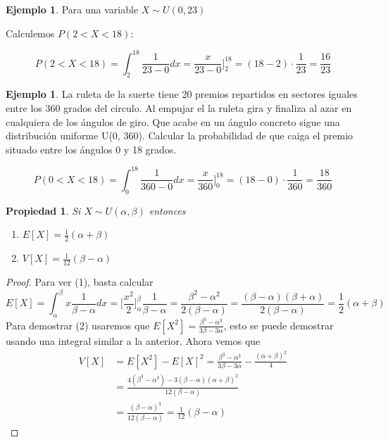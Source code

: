 \documentclass[]{book}
\theoremstyle{plain}
\newtheorem{property}[theorem]{Propiedad}
\theoremstyle{definition}
\newtheorem{example}[theorem]{Ejemplo}
\theoremstyle{definition} %
\begin{document}
\begin{example}
  Para una variable  $\displaystyle X\sim U(0,23)$


  Calculemos $\displaystyle  P(2<X<18)$:

   \[\displaystyle P(2<X<18)=\int^{18}_2 \frac {1}{23-0} dx 
   =  \frac {x}{23-0} \bigg]^{18}_2 =  (18-2)\cdot {\frac {1}{23}}={\frac {16}{23}} \]
\end{example}

\begin{example}
La ruleta de la suerte tiene 20 premios repartidos en sectores iguales entre los 360 grados del círculo. Al empujar el 
la ruleta gira y finaliza al azar en cualquiera de los ángulos de giro. 
Que acabe en un ángulo concreto sigue una distribución uniforme U(0, 360). 
Calcular la probabilidad de que caiga el premio situado entre los ángulos 0 y 18 grados.
 

\[\displaystyle P(0<X<18)=\int^{18}_0 \frac {1}{360-0} dx 
=  \frac {x}{360} \bigg]^{18}_0 =  (18-0)\cdot {\frac {1}{360}}={\frac {18}{360}} \]

\end{example}

\begin{property}
  Si $X \sim  U(\alpha, \beta)$ entonces 
  \begin{enumerate}
    \item $E[X] = \frac{1}{2} (\alpha+\beta)$
    \item $V[X] = \frac{1}{12} (\beta-\alpha)$
  \end{enumerate}
\end{property}

\begin{proof}
  Para ver (1), basta calcular 
  \[E[X] = \int^{\beta}_{\alpha} x \frac{1}{\beta - \alpha} dx 
  = \bigg[\frac{x^2}{2}\bigg]^{\beta}_{\alpha}\frac{1}{\beta - \alpha}  =  \frac{\beta^2-\alpha^2}{2(\beta - \alpha)}
  = \frac{(\beta-\alpha)(\beta + \alpha)}{2(\beta - \alpha)} = \frac{1}{2} (\alpha+\beta) \]
  Para demostrar (2) usaremos que $E[X^2] = \frac{\beta^3 - \alpha^3}{3\beta - 3\alpha}$, esto se puede demostrar usando una integral similar a la anterior. 
  Ahora vemos que 
  \begin{align*}
    V[X] &= E[X^2] - E[X]^2 = \frac{\beta^3 - \alpha^3}{3\beta-3\alpha} - \frac{(\alpha+\beta)^2}{4} \\
    &= \frac{4(\beta^3 - \alpha^3) - 3(\beta-\alpha)(\alpha+\beta)^2}{12(\beta-\alpha)} \\
    &= \frac{(\beta-\alpha)^3}{12(\beta - \alpha)} = \frac{1}{12} (\beta-\alpha)
  \end{align*}
 
\end{proof}
\end{document}
